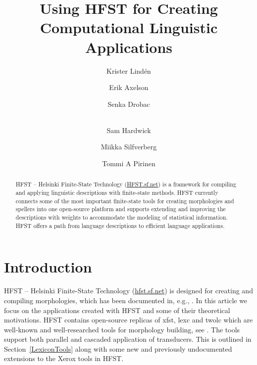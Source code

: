 \documentclass{llncs}
\begin{document}
%
\title{Using HFST for Creating Computational Linguistic Applications}
%
\author{Krister Lind\'{e}n \and Erik Axelson \and Senka Drobac \and\\
  Sam Hardwick \and Miikka Silfverberg \and Tommi A Pirinen }


\maketitle

\begin{abstract}
  \sloppy HFST – Helsinki Finite-State Technology (\url{HFST.sf.net})
  is a framework for compiling and applying linguistic descriptions
  with finite-state methods. HFST currently connects some of the most 
  important finite-state tools for creating morphologies and spellers into 
  one open-source platform and supports extending and improving 
  the descriptions with weights to accommodate the modeling of 
  statistical information. HFST offers a path from language descriptions 
  to efficient language applications.

\end{abstract}

\section{Introduction}

HFST – Helsinki Finite-State Technology (\url{hfst.sf.net}) is designed 
for creating and compiling morphologies, which has been documented in, e.g.,  
\cite{linden/2009/sfcm,linden/2011/sfcm}. In this article we focus on the applications 
created with HFST and some of their theoretical motivations. HFST
contains open-source replicas of xfst, lexc and twolc which are
well-known and well-researched tools for morphology building, see \cite{beesley/2003}. The tools
support both parallel and cascaded application of transducers. 
This is outlined in Section~\ref{LexiconTools} along with some new and 
previously undocumented extensions to the Xerox tools in HFST.  
\end{document}
